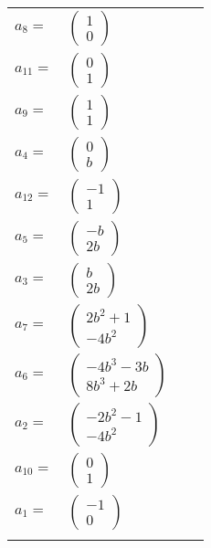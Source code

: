 \documentclass[1p]{elsarticle_modified}
\theoremstyle{definition}
\begin{document}
\begin{tabular}{m{7pt} m{180pt} m{7pt} m{180pt} }
\flushright $a_{8}=$&$\begin{pmatrix}1\\0\end{pmatrix}$ \\
\flushright $a_{11}=$&$\begin{pmatrix}0\\1\end{pmatrix}$ \\
\flushright $a_{9}=$&$\begin{pmatrix}1\\1\end{pmatrix}$ \\
\flushright $a_{4}=$&$\begin{pmatrix}0\\b\end{pmatrix}$ \\
\flushright $a_{12}=$&$\begin{pmatrix}-1\\1\end{pmatrix}$ \\
\flushright $a_{5}=$&$\begin{pmatrix}- b\\2 b\end{pmatrix}$ \\
\flushright $a_{3}=$&$\begin{pmatrix}b\\2 b\end{pmatrix}$ \\
\flushright $a_{7}=$&$\begin{pmatrix}2 b^2+1\\-4 b^2\end{pmatrix}$ \\
\flushright $a_{6}=$&$\begin{pmatrix}-4 b^3-3 b\\8 b^3+2 b\end{pmatrix}$ \\
\flushright $a_{2}=$&$\begin{pmatrix}-2 b^2-1\\-4 b^2\end{pmatrix}$ \\
\flushright $a_{10}=$&$\begin{pmatrix}0\\1\end{pmatrix}$ \\
\flushright $a_{1}=$&$\begin{pmatrix}-1\\0\end{pmatrix}$\\&\end{tabular}
\end{document}
